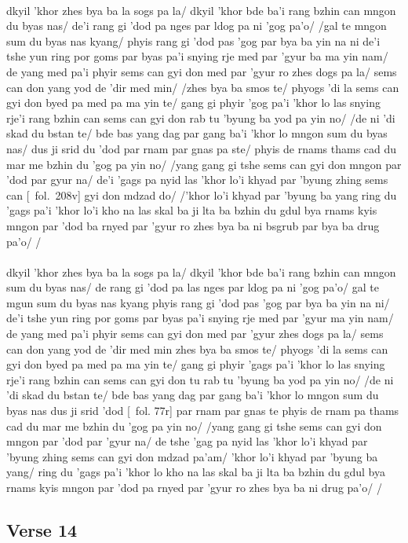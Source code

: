 \documentclass[12pt]{article}
\begin{document}
\textbf{\TVA}\\
dkyil 'khor zhes bya ba la sogs pa la/ dkyil 'khor bde ba'i rang bzhin can mngon du byas nas/ de'i rang gi 'dod pa nges par ldog pa ni 'gog pa'o/ /gal te mngon sum du byas nas kyang/ phyis rang gi 'dod pas 'gog par bya ba yin na ni de'i tshe yun ring por goms par byas pa'i snying rje med par 'gyur ba ma yin nam/ de yang med pa'i phyir sems can gyi don med par 'gyur ro zhes dogs pa la/ sems can don yang yod de 'dir med min/ /zhes bya ba smos te/ phyogs 'di la sems can gyi don byed pa med pa ma yin te/ gang gi phyir 'gog pa'i 'khor lo las snying rje'i rang bzhin can sems can gyi don rab tu 'byung ba yod pa yin no/ /de ni 'di skad du bstan te/ bde bas yang dag par gang ba'i 'khor lo mngon sum du byas nas/ dus ji srid du 'dod par rnam par gnas pa ste/ phyis de rnams thams cad du mar me bzhin du 'gog pa yin no/ /yang gang gi tshe sems can gyi don mngon par 'dod par gyur na/ de'i 'gags pa nyid las 'khor lo'i khyad par 'byung zhing sems can [\TVA\ fol.\ 208v] gyi don mdzad do/ /'khor lo'i khyad par 'byung ba yang ring du 'gags pa'i 'khor lo'i kho na las skal ba ji lta ba bzhin du gdul bya rnams kyis mngon par 'dod ba rnyed par 'gyur ro zhes bya ba ni bsgrub par bya ba drug pa'o/ /\\

\textbf{\TVB}\\
dkyil 'khor zhes bya ba la sogs pa la/ dkyil 'khor bde ba'i rang bzhin can mngon sum du byas nas/ de rang gi 'dod pa las nges par ldog pa ni 'gog pa'o/ gal te mgun sum du byas nas kyang phyis rang gi 'dod pas 'gog par bya ba yin na ni/ de'i tshe yun ring por goms par byas pa'i snying rje med par 'gyur ma yin nam/ de yang med pa'i phyir sems can gyi don med par 'gyur zhes dogs pa la/ sems can don yang yod de 'dir med min zhes bya ba smos te/ phyogs 'di la sems can gyi don byed pa med pa ma yin te/ gang gi phyir 'gags pa'i 'khor lo las snying rje'i rang bzhin can sems can gyi don tu rab tu 'byung ba yod pa yin no/ /de ni 'di skad du bstan te/ bde bas yang dag par gang ba'i 'khor lo mngon sum du byas nas dus ji srid 'dod [\TVB\ fol. 77r] par rnam par gnas te phyis de rnam pa thams cad du mar me bzhin du 'gog pa yin no/ /yang gang gi tshe sems can gyi don mngon par 'dod par 'gyur na/ de tshe 'gag pa nyid las 'khor lo'i khyad par 'byung zhing sems can gyi don mdzad pa'am/ 'khor lo'i khyad par 'byung ba yang/ ring du 'gags pa'i 'khor lo kho na las skal ba ji lta ba bzhin du gdul bya rnams kyis mngon par 'dod pa rnyed par 'gyur ro zhes bya ba ni drug pa'o/ /

\subsection{Verse 14}
\end{document}

